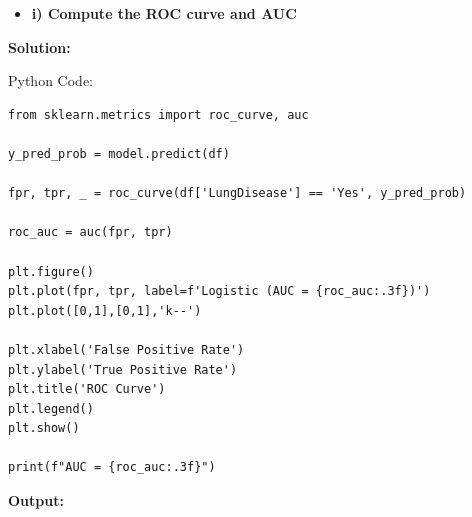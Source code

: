 \documentclass[12pt]{article}
\begin{document}
\begin{itemize}
    \item\textbf{i) Compute the ROC curve and AUC}
\end{itemize}

{\large\textbf{Solution:}}

\vspace{0.1cm}

{\large{Python Code:}}

\vspace{0.2cm}

\begin{verbatim}
from sklearn.metrics import roc_curve, auc

y_pred_prob = model.predict(df)

fpr, tpr, _ = roc_curve(df['LungDisease'] == 'Yes', y_pred_prob)

roc_auc = auc(fpr, tpr)

plt.figure()
plt.plot(fpr, tpr, label=f'Logistic (AUC = {roc_auc:.3f})')
plt.plot([0,1],[0,1],'k--')

plt.xlabel('False Positive Rate')
plt.ylabel('True Positive Rate')
plt.title('ROC Curve')
plt.legend()
plt.show()

print(f"AUC = {roc_auc:.3f}")
\end{verbatim}

\textbf{Output:}

\vspace{0.3cm}
\end{document}
